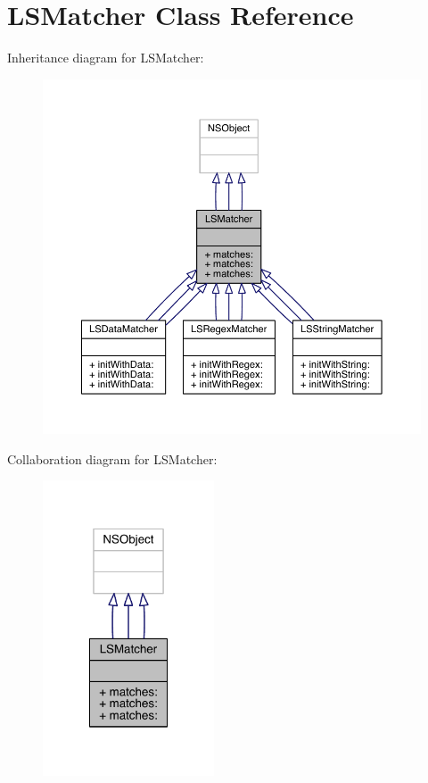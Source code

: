 \hypertarget{interface_l_s_matcher}{\section{L\-S\-Matcher Class Reference}
\label{interface_l_s_matcher}
}


Inheritance diagram for L\-S\-Matcher\-:\nopagebreak
\begin{figure}[H]
\begin{center}
\leavevmode
\includegraphics[width=350pt]{interface_l_s_matcher__inherit__graph}
\end{center}
\end{figure}


Collaboration diagram for L\-S\-Matcher\-:\nopagebreak
\begin{figure}[H]
\begin{center}
\leavevmode
\includegraphics[width=144pt]{interface_l_s_matcher__coll__graph}
\end{center}
\end{figure}
